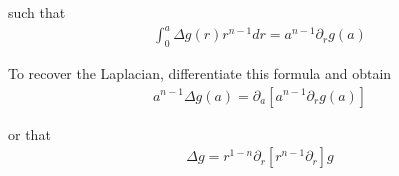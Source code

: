 \documentclass{article}
\newcommand{\pd}{\partial}
\begin{document}
	such that 
	\begin{align*}
		\int_{0}^{a} \Delta g(r) r^{n-1} dr = a^{n-1} \pd_{r}g(a)
	\end{align*}
	
	To recover the Laplacian, differentiate this formula and obtain 
	\begin{align*}
		a^{n-1} \Delta g(a) = \pd_{a} \left[a^{n-1} \pd_{r}g(a) \right]
	\end{align*}
	
	or that 
	\begin{align*}
		\Delta g = r^{1-n} \pd_{r} \left[r^{n-1} \pd_{r} \right]g
	\end{align*}
	
	
	
	
	
	
\end{document}
